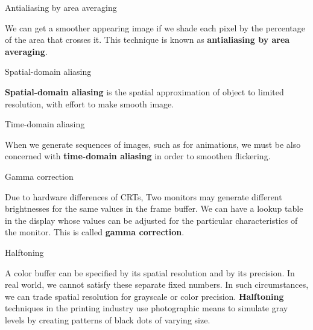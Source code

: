 \documentclass[10pt,a4paper]{article}
\begin{document}
\begin{enumerate}
		\pagebreak
		{\large \item Antialiasing by area averaging}
		
			We can get a smoother appearing image if we shade each pixel by the percentage of the area that crosses it. This technique is known as \textbf{antialiasing by area averaging}.\\
		
		{\large \item Spatial-domain aliasing}
	
			\textbf{Spatial-domain aliasing} is the spatial approximation of object to limited resolution, with effort to make smooth image.\\
			
		
		{\large \item Time-domain aliasing}
		
			When we generate sequences of images, such as for animations, we must be also concerned with \textbf{time-domain aliasing} in order to smoothen flickering.\\
			
		{\large \item Gamma correction}
			
			Due to hardware differences of CRTs, Two monitors may generate different brightnesses for the same values in the frame buffer. We can have a lookup table in the display whose values can be adjusted for the particular characteristics of the monitor. This is called \textbf{gamma correction}.\\
			
		{\large \item Halftoning}
			
			A color buffer can be specified by its spatial resolution and by its precision. In real world, we cannot satisfy these separate fixed numbers. In such circumstances, we can trade spatial resolution for grayscale or color precision. \textbf{Halftoning} techniques in the printing industry use photographic means to simulate gray levels by creating patterns of black dots of varying size.\\
	\end{enumerate}
\end{document}

